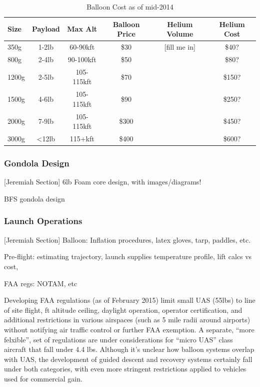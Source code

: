 \documentclass[heading.tex]{subfiles}
\begin{document}
\begin{table}[h]
    \centering
    \caption{Balloon Cost as of mid-2014}
    \label{tab:desvars}
    \begin{tabular}{l  c  c  c  c  c} 
        \hline \hline
        Size &  Payload & Max Alt & Balloon Price & Helium Volume &Helium Cost\\ \hline \hline
        350g & 1-2lb & 60-90kft & \$30 & [fill me in] & \$40? \\ 
        800g & 2-4lb & 90-100kft & \$50 & & \$80? \\ 
        1200g & 2-5lb & 105-115kft & \$70 & & \$150? \\ 
        1500g & 4-6lb & 105-115kft & \$90 & & \$250?\\
        2000g & 7-9lb & 105-115kft & \$300 & & \$450?\\ 
        3000g & \textless 12lb & 115+kft & \$400 & & \$600?\\ \hline
    \end{tabular}
\end{table}


\subsubsection{Gondola Design}

[Jeremiah Section]
\<6lb Foam core design, with images/diagrams!

BFS gondola design

\subsubsection{Launch Operations}

[Jeremiah Section]
Balloon: Inflation procedures, latex gloves, tarp, paddles, etc.

Pre-flight: estimating trajectory, launch supplies
temperature profile, lift calcs vs cost, 

FAA regs: NOTAM, etc

Developing FAA regulations (as of February 2015) limit small UAS (\<55lbs) to
line of site flight,  ft altitude ceiling, daylight operation, operator certification,
and additional restrictions in various airspaces (such as 5 mile radii around airports)
without notifying air traffic control or further FAA exemption.
A separate, ``more felxible'', set of regulations are under considerations
for ``micro UAS'' class aircraft that fall under 4.4 lbs.
Although it's unclear how balloon systems overlap with UAS, the development
of guided descent and recovery systems certainly fall under both categories,
with even more stringent restrictions applied to vehicles used for commercial gain.
\cite{FAAuav}
\end{document}
